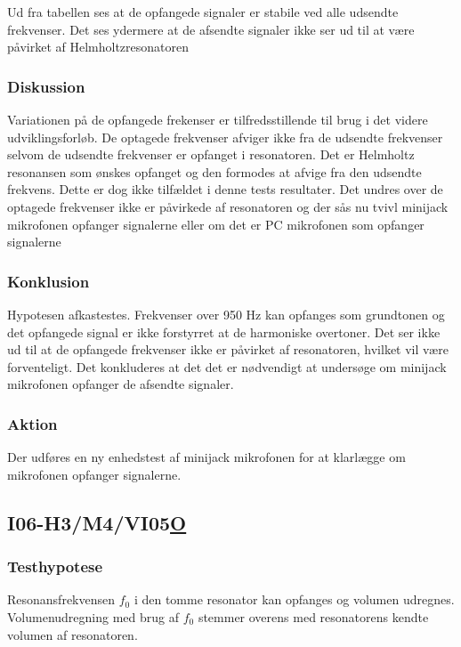 			Ud fra tabellen ses at de opfangede signaler er stabile ved alle udsendte frekvenser. Det ses ydermere at de afsendte signaler ikke ser ud til at være påvirket af Helmholtzresonatoren
				
			  
			\subsubsection{Diskussion}
			 Variationen på de opfangede frekenser er tilfredsstillende til brug i det videre udviklingsforløb. De optagede frekvenser afviger ikke fra de udsendte frekvenser selvom de udsendte frekvenser er opfanget i resonatoren. Det er Helmholtz resonansen som ønskes opfanget og den formodes at afvige fra den udsendte frekvens. Dette er dog ikke tilfældet i denne tests resultater. Det undres over de optagede frekvenser ikke er påvirkede af resonatoren og der sås nu tvivl minijack mikrofonen opfanger signalerne eller om det er PC mikrofonen som opfanger signalerne
			
			\subsubsection{Konklusion}
			Hypotesen afkastestes. Frekvenser over 950 Hz kan opfanges som grundtonen og det opfangede signal er ikke forstyrret at de harmoniske overtoner. Det ser ikke ud til at de opfangede frekvenser ikke er påvirket af resonatoren, hvilket vil være forventeligt. Det konkluderes at det det er nødvendigt at undersøge om minijack mikrofonen opfanger de afsendte signaler. 
			
			\subsubsection{Aktion}
			 Der udføres en ny enhedstest af minijack mikrofonen for at klarlægge om mikrofonen opfanger signalerne. 
			 
 	\subsection{I06-H3/M4/VI05\underline{O}}
	
	\subsubsection{Testhypotese}
	 Resonansfrekvensen $f_{0}$ i den tomme resonator kan opfanges og volumen udregnes.  Volumenudregning med brug af $f_{0}$ stemmer overens med resonatorens kendte volumen af resonatoren.  	
	
